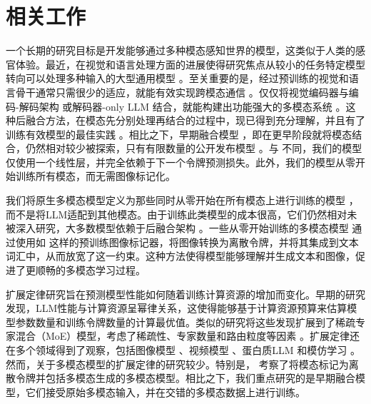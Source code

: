 \section{相关工作}

 一个长期的研究目标是开发能够通过多种模态感知世界的模型，这类似于人类的感官体验。最近，在视觉和语言处理方面的进展使得研究焦点从较小的任务特定模型转向可以处理多种输入的大型通用模型 \citep{team2023gemini,hurst2024gpt4o}。至关重要的是，经过预训练的视觉和语言骨干通常只需很少的适应，就能有效实现跨模态通信 \citep{tsimpoukelli2021multimodalfrozen,shukor2023epalm,vallaeys2024improveddepalm,merullo2023linearly,koh2023grounding}。仅仅将视觉编码器与编码-解码架构 \citep{shukor2023unival,wang2022ofa,lu2022unified,mizrahi20234m} 或解码器-only LLM 结合，就能构建出功能强大的多模态系统 \citep{laurenccon2024mattersidefics2,alayrac2022flamingo,liu2024improvedllava,wang2024qwen2,xue2024xgenblip3,chen2024internvl,zhu2024minigpt,abdin2024phi3,dai2024nvlm,beyer2024paligemma,moon2024anymal}。这种后融合方法，在模态先分别处理再结合的过程中，现已得到充分理解，并且有了训练有效模型的最佳实践 \citep{laurenccon2024obelics,mckinzie2025mm1,zhang2024mm1_5,lin2024vila}。相比之下，早期融合模型 \citep{fuyu8b,team2024chameleon,diao2024unveiling}，即在更早阶段就将模态结合，仍然相对较少被探索，只有有限数量的公开发布模型 \citep{fuyu8b,diao2024unveiling}。与 \citep{diao2024unveiling,team2024chameleon} 不同，我们的模型仅使用一个线性层，并完全依赖于下一个令牌预测损失。此外，我们的模型从零开始训练所有模态，而无需图像标记化。

 我们将原生多模态模型定义为那些同时从零开始在所有模态上进行训练的模型 \citep{team2023gemini}，而不是将LLM适配到其他模态。由于训练此类模型的成本很高，它们仍然相对未被深入研究，大多数模型依赖于后融合架构 \citep{kosmoshuang2023language,yu2022coca}。一些从零开始训练的多模态模型 \citep{aghajanyan2022cm3,team2024chameleon,wang2024emu3} 通过使用如 \citep{vqgan,vqvae} 这样的预训练图像标记器，将图像转换为离散令牌，并将其集成到文本词汇中，从而放宽了这一约束。这种方法使得模型能够理解并生成文本和图像，促进了更顺畅的多模态学习过程。

 扩展定律研究旨在预测模型性能如何随着训练计算资源的增加而变化。早期的研究 \citep{kaplan2020scaling,hoffmann2022training} 发现，LLM性能与计算资源呈幂律关系，这使得能够基于计算资源预算来估算模型参数数量和训练令牌数量的计算最优值。类似的研究将这些发现扩展到了稀疏专家混合（MoE）模型，考虑了稀疏性、专家数量和路由粒度等因素 \citep{krajewski2024scalingmoe,clark2022unifiedscalingmoe,wangscalingmoe}。扩展定律还在多个领域得到了观察，包括图像模型 \citep{fini2024multimodalaimv2}、视频模型 \citep{rajasegaran2025empirical}、蛋白质LLM \citep{scalingprotein} 和模仿学习 \citep{pearce2024scaling}。然而，关于多模态模型的扩展定律的研究较少。特别是，\citet{aghajanyan2023scalingmm} 考察了将模态标记为离散令牌并包括多模态生成的多模态模型。相比之下，我们重点研究的是早期融合模型，它们接受原始多模态输入，并在交错的多模态数据上进行训练。

